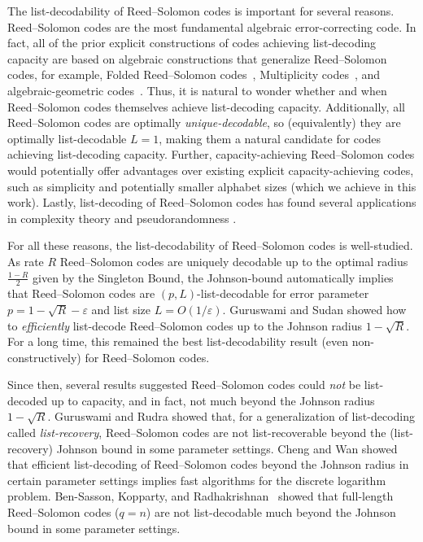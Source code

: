 \documentclass{article}[11pt]
\begin{document}
The list-decodability of Reed--Solomon codes is important for several reasons.
Reed--Solomon codes are the most fundamental algebraic error-correcting code. 
In fact, all of the prior explicit constructions of codes achieving list-decoding capacity are based on algebraic constructions that generalize Reed--Solomon codes, for example, Folded Reed--Solomon codes~\cite{GuruswamiR08,KRSW18}, Multiplicity codes~\cite{GW13,Kop15,KRSW18}, and algebraic-geometric codes~\cite{DL12,GX12,GX13,HRW19}.
Thus, it is natural to wonder whether and when Reed--Solomon codes themselves achieve list-decoding capacity.
Additionally, all Reed--Solomon codes are optimally \emph{unique-decodable}, so (equivalently) they are optimally list-decodable $L=1$, making them a natural candidate for codes achieving list-decoding capacity. 
Further, capacity-achieving Reed--Solomon codes would potentially offer advantages over existing explicit capacity-achieving codes, such as simplicity and potentially smaller alphabet sizes (which we achieve in this work).
Lastly, list-decoding of Reed–Solomon codes has found several applications in complexity theory and pseudorandomness \cite{CPS99, STV01,LP20}.

For all these reasons, the list-decodability of Reed--Solomon codes is well-studied. As rate $R$ Reed--Solomon codes are uniquely decodable up to the optimal radius $\frac{1-R}{2}$ given by the Singleton Bound, the Johnson-bound \cite{Johnson62} automatically implies that Reed--Solomon codes are $(p,L)$-list-decodable for error parameter $p=1-\sqrt{R}-\varepsilon$ and list size $L=O(1/\varepsilon)$.
Guruswami and Sudan \cite{GuruswamiS99} showed how to \emph{efficiently} list-decode Reed--Solomon codes up to the Johnson radius $1-\sqrt{R}$.
For a long time, this remained the best list-decodability result (even non-constructively) for Reed--Solomon codes.

Since then, several results suggested Reed--Solomon codes could \emph{not} be list-decoded up to capacity, and in fact, not much beyond the Johnson radius $1-\sqrt{R}$.
Guruswami and Rudra \cite{GR06} showed that, for a generalization of list-decoding called \emph{list-recovery}, Reed--Solomon codes are not list-recoverable beyond the (list-recovery) Johnson bound in some parameter settings.
Cheng and Wan \cite{CW07} showed that efficient list-decoding of Reed--Solomon codes beyond the Johnson radius in certain parameter settings implies fast algorithms for the discrete logarithm problem.
Ben-Sasson, Kopparty, and Radhakrishnan~\cite{BKR10} showed that full-length Reed--Solomon codes ($q=n$) are not list-decodable much beyond the Johnson bound in some parameter settings.
\end{document}

